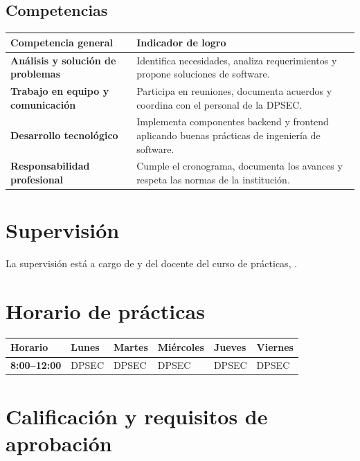 \documentclass[12pt,a4paper]{article}
\begin{document}
\subsection{Competencias}
\begin{tabularx}{\textwidth}{>{\bfseries}Y Y}
\toprule
Competencia general & Indicador de logro\\
\midrule
Análisis y solución de problemas & Identifica necesidades, analiza requerimientos y propone soluciones de software.\\
Trabajo en equipo y comunicación & Participa en reuniones, documenta acuerdos y coordina con el personal de la DPSEC.\\
Desarrollo tecnológico & Implementa componentes backend y frontend aplicando buenas prácticas de ingeniería de software.\\
Responsabilidad profesional & Cumple el cronograma, documenta los avances y respeta las normas de la institución.\\
\bottomrule
\end{tabularx}

\section{Supervisión}
La supervisión está a cargo de \InstitucionJefa y del docente del curso de prácticas, \Precidente.

\section{Horario de prácticas}
\begin{center}
\begin{tabular}{>{\bfseries}p{3cm}*{5}{>{\centering\arraybackslash}p{2cm}}}
\toprule
Horario & Lunes & Martes & Miércoles & Jueves & Viernes\\
\midrule
8:00--12:00 & DPSEC & DPSEC & DPSEC & DPSEC & DPSEC\\
\bottomrule
\end{tabular}
\end{center}

\section{Calificación y requisitos de aprobación}
\end{document}

